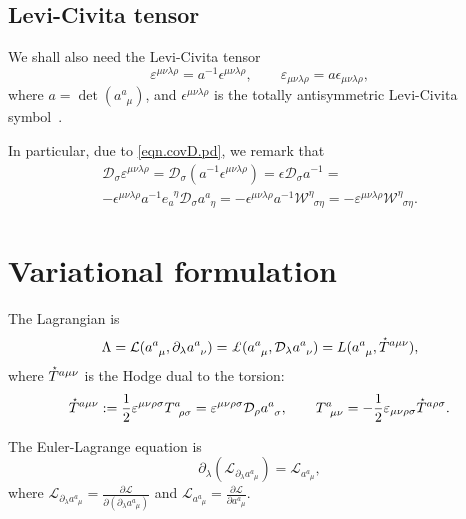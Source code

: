 \documentclass[
10pt, %
a4paper, %
oneside, %
headinclude,footinclude, %
BCOR5mm, %
]{scrartcl}
\newcommand{\pd}{\partial}
\newcommand{\itetr}[2]{e^{\phantom{#2}#1}_{#2}}
\newcommand{\tetr}[2]{a^{#1}_{\phantom{#1}#2}}
\newcommand{\D}[1]{\mathcal{D}_{#1}} %
\newcommand{\Tors}[2]{T^{#1}_{\phantom{a}#2}}
\newcommand{\W}[2]{\mathcal{W}^{#1}_{\phantom{#1}#2}}
\newcommand{\Lag}{\mathcal{L}}	%
\newcommand{\Lagcov}{\pounds}%
\newcommand{\Laghodge}{L}%
\newcommand{\veps}{\varepsilon}
\newcommand{\HT}[1]{\accentset{\star}{T}^{#1}}
\begin{document}
\subsection{Levi-Civita tensor}
We shall also need the Levi-Civita tensor
\begin{equation}\label{def.LeviCivita}
\veps^{\mu\nu\lambda\rho} = a^{-1} \epsilon^{\mu\nu\lambda\rho}, \qquad \veps_{\mu\nu\lambda\rho} = 
a 
\epsilon_{\mu\nu\lambda\rho},
\end{equation}
where $ a = \det(\tetr{a}{\mu}) $, and $ 
\epsilon^{{\mu\nu\lambda\rho}} $ is the totally antisymmetric Levi-Civita 
symbol~\cite{AldrovandiPereiraBook}.

In particular, due to \eqref{eqn.covD.pd}, we remark that 
\begin{multline}
\D{\sigma}\veps^{\mu\nu\lambda\rho} = \D{\sigma}(a^{-1}\epsilon^{\mu\nu\lambda\rho}) = 
\epsilon\D{\sigma}a^{-1} = 
\\
-\epsilon^{\mu\nu\lambda\rho}a^{-1}\itetr{\eta}{a}\D{\sigma}\tetr{a}{\eta} = 
-\epsilon^{\mu\nu\lambda\rho}a^{-1}\W{\eta}{\sigma\eta} = 
-\veps^{\mu\nu\lambda\rho}\W{\eta}{\sigma\eta} . 
\end{multline}


\section{Variational formulation}
The Lagrangian is 
\begin{equation}
\Lambda = \Lag(\tetr{a}{\mu},\pd_\lambda\tetr{a}{\nu}) = 
\Lagcov(\tetr{a}{\mu},\D{\lambda}\tetr{a}{\nu})  = \Laghodge(\tetr{a}{\mu},\HT{a\mu\nu}),
\end{equation}
where $ \HT{a\mu\nu} $ is the Hodge dual to the torsion:
\begin{equation}\label{eqn.Hodge.def}
\HT{a\mu\nu} := \frac{1}{2}\veps^{\mu\nu\rho\sigma}\Tors{a}{\rho\sigma} = 
\veps^{\mu\nu\rho\sigma}\D{\rho}\tetr{a}{\sigma}, \qquad \Tors{a}{\mu\nu} = 
-\frac{1}{2}\veps_{\mu\nu\rho\sigma}\HT{a\rho\sigma}.
\end{equation}




The Euler-Lagrange equation is
\begin{equation}
\pd_\lambda(\Lag_{\pd_\lambda\tetr{a}{\mu}}) = \Lag_{\tetr{a}{\mu}},
\end{equation}
where $ \Lag_{\pd_\lambda\tetr{a}{\mu}} = \frac{\pd \Lag}{\pd(\pd_\lambda\tetr{a}{\mu})} $ and $ 
\Lag_{\tetr{a}{\mu}} = \frac{\pd \Lag}{\pd \tetr{a}{\mu}} $.
\end{document}

